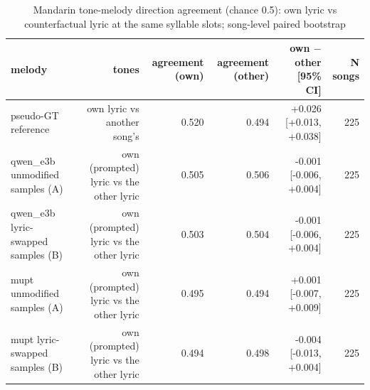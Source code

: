 \begin{table}[t]
\centering
\small
\begin{tabular}{lrrrrr}
\toprule
melody & tones & agreement (own) & agreement (other) & own $-$ other [95\% CI] & N songs \\
\midrule
pseudo-GT reference & own lyric vs another song's & 0.520 & 0.494 & +0.026 [+0.013, +0.038] & 225 \\
qwen\_e3b unmodified samples (A) & own (prompted) lyric vs the other lyric & 0.505 & 0.506 & -0.001 [-0.006, +0.004] & 225 \\
qwen\_e3b lyric-swapped samples (B) & own (prompted) lyric vs the other lyric & 0.503 & 0.504 & -0.001 [-0.006, +0.004] & 225 \\
mupt unmodified samples (A) & own (prompted) lyric vs the other lyric & 0.495 & 0.494 & +0.001 [-0.007, +0.009] & 225 \\
mupt lyric-swapped samples (B) & own (prompted) lyric vs the other lyric & 0.494 & 0.498 & -0.004 [-0.013, +0.004] & 225 \\
\bottomrule
\end{tabular}
\caption{Mandarin tone-melody direction agreement (chance 0.5): own lyric vs counterfactual lyric at the same syllable slots; song-level paired bootstrap}
\label{tab:tone_melody}
\end{table}
